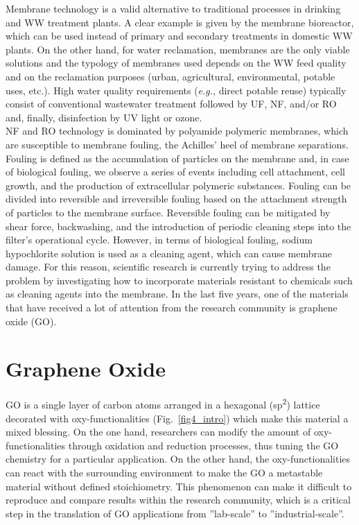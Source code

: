 Membrane technology is a valid alternative to traditional processes in drinking and WW treatment plants. A clear example is given by the membrane bioreactor, which can be used instead of primary and secondary treatments in domestic WW plants. On the other hand, for water reclamation, membranes are the only viable solutions and the typology of membranes used depends on the WW feed quality and on the reclamation purposes (urban, agricultural, environmental, potable uses, etc.). High water quality requirements (\textit{e.g.}, direct potable reuse) typically consist of conventional wastewater treatment followed by UF, NF, and/or RO and, finally, disinfection by UV light or ozone.\\
NF and RO technology is dominated by polyamide polymeric membranes, which are susceptible to membrane fouling, the Achilles' heel of membrane separations.\cite{safarpour2015thin} Fouling is defined as the accumulation of particles on the membrane and, in case of biological fouling, we observe a series of events including cell attachment, cell growth, and the production of extracellular polymeric substances. Fouling can be divided into reversible and irreversible fouling based on the attachment strength of particles to the membrane surface. Reversible fouling can be mitigated by shear force, backwashing, and the introduction of periodic cleaning steps into the filter's operational cycle. However, in terms of biological fouling, sodium hypochlorite solution is used as a cleaning agent, which can cause membrane damage.\cite{chae2015graphene} For this reason, scientific research is currently trying to address the problem by investigating how to incorporate materials resistant to chemicals such as cleaning agents into the membrane. In the last five years, one of the materials that have received a lot of attention from the research community is graphene oxide (GO).

\section{Graphene Oxide}
GO is a single layer of carbon atoms arranged in a hexagonal (sp\textsuperscript{2}) lattice decorated with oxy-functionalities (Fig.~\ref{fig4_intro}) which make this material a mixed blessing.\cite{Dreyer2010} On the one hand, researchers can modify the amount of oxy-functionalities through oxidation and reduction processes,\cite{Pei2012} thus tuning the GO chemistry for a particular application. On the other hand, the oxy-functionalities can react with the surrounding environment to make the GO a metastable material without defined stoichiometry.\cite{hou2015photochemical} This phenomenon can make it difficult to reproduce and compare results within the research community, which is a critical step in the translation of GO applications from ''lab-scale'' to ''industrial-scale''.

